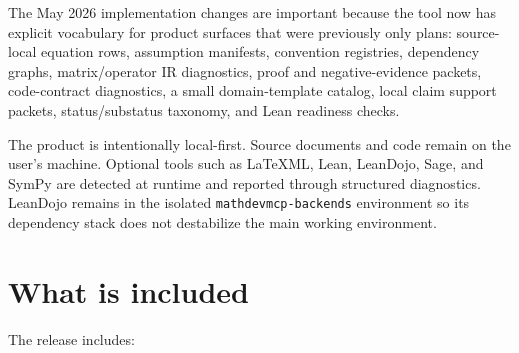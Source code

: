 \documentclass[12pt,a4paper,openany]{book}
\begin{document}
The May 2026 implementation changes are important because the tool now has
explicit vocabulary for product surfaces that were previously only plans:
source-local equation rows, assumption manifests, convention registries,
dependency graphs, matrix/operator IR diagnostics, proof and negative-evidence
packets, code-contract diagnostics, a small domain-template catalog, local claim
support packets, status/substatus taxonomy, and Lean readiness checks.

The product is intentionally local-first. Source documents and code remain on
the user's machine. Optional tools such as LaTeXML, Lean, LeanDojo, Sage, and
SymPy are detected at runtime and reported through structured diagnostics.
LeanDojo remains in the isolated \texttt{mathdevmcp-backends} environment so its
dependency stack does not destabilize the main working environment.

\section{What is included}

The release includes:
\end{document}
